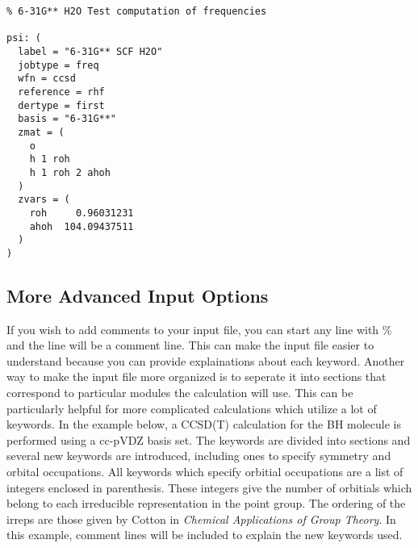 \begin{verbatim}
% 6-31G** H2O Test computation of frequencies

psi: (
  label = "6-31G** SCF H2O"
  jobtype = freq
  wfn = ccsd
  reference = rhf
  dertype = first
  basis = "6-31G**"
  zmat = (
    o
    h 1 roh
    h 1 roh 2 ahoh
  )
  zvars = (
    roh     0.96031231
    ahoh  104.09437511
  )
)
\end{verbatim}

\subsection{More Advanced Input Options}
If you wish to add comments to your input file, you can start any line
with \% and the line will be a comment line.  This can make the input
file easier to understand because you can provide explainations about
each keyword.  Another way to make the input file more organized is
to seperate it into sections that correspond to particular modules
the calculation will use.  This can be particularly helpful for more
complicated calculations which utilize a lot of keywords.  In the example
below, a CCSD(T) calculation for the BH molecule is performed using a
cc-pVDZ basis set.  The keywords are divided into sections and several
new keywords are introduced, including ones to specify symmetry and
orbital occupations.  All keywords which specify orbitial occupations
are a list of integers enclosed in parenthesis.  These integers give the
number of orbitials which belong to each irreducible representation in
the point group.  The ordering of the irreps are those given by Cotton
in {\em Chemical Applications of Group Theory}.  In this example,
comment lines will be included to explain the new keywords used.

